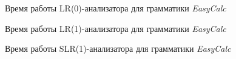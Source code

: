 \documentclass[14pt]{matmex-diploma}
\begin{document}
\begin{figure}[h]
  \caption{Время работы LR(0)-анализатора для грамматики \textit{EasyCalc}}
  \label{EasyCalcLR0}
  \centering
\end{figure}


\begin{figure}[H]
  \caption{Время работы LR(1)-анализатора для грамматики \textit{EasyCalc}}
  \label{EasyCalcLR1}
  \centering
\end{figure}


\begin{figure}[h]
  \caption{Время работы SLR(1)-анализатора для грамматики \textit{EasyCalc}}
  \label{EasyCalcSLR1}
  \centering
\end{figure}
\end{document}
